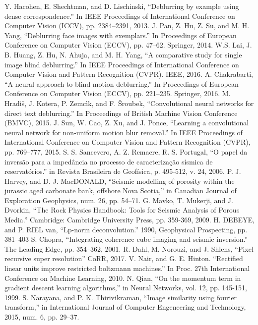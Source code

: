 \documentclass[conference]{IEEEtran}
\begin{document}
\begin{thebibliography}{00}
		Y. Hacohen, E. Shechtman, and D. Lischinski, ``Deblurring by example using dense correspondence.'' In IEEE Proceedings of International Conference on Computer Vision (ICCV), pp. 2384–2391, 2013.
		J. Pan, Z. Hu, Z. Su, and M. H. Yang, ``Deblurring face images with exemplars.'' In Proceedings of European Conference on Computer Vision (ECCV), pp. 47–62. Springer, 2014.
		W.S. Lai, J. B. Huang, Z. Hu, N. Ahuja, and M. H. Yang, ``A comparative study for single image blind deblurring.'' In IEEE Proceedings of International Conference on Computer Vision and Pattern Recognition (CVPR). IEEE, 2016.
	A. Chakrabarti, ``A neural approach to blind motion deblurring.'' In Proceedings of European Conference on Computer Vision (ECCV), pp. 221–235. Springer, 2016.
		M. Hradiš, J. Kotera, P. Zemcı́k, and F. Šroubek, ``Convolutional neural networks for direct text deblurring.'' In Proceedings of British Machine Vision Conference (BMVC), 2015.
		J. Sun, W. Cao, Z. Xu, and J. Ponce, ``Learning a convolutional neural network for non-uniform motion blur removal.'' In IEEE Proceedings of International Conference on Computer Vision and Pattern Recognition (CVPR), pp. 769–777, 2015.
		S. S. Sancevero, A. Z. Remacre, R. S. Portugal, ``O papel da inversão para a impedância no processo de caracterização sísmica de reservatórios.'' in Revista Brasileira de Geofísica, p. 495-512, v. 24, 2006.
 		P. J. Harvey, and D. J. MacDONALD, ``Seismic modelling of porosity within the jurassic aged carbonate bank, offshore Nova Scotia,'' in  Canadian Journal of Exploration Geophysics, num. 26, pp. 54–71.
		G. Mavko, T. Mukerji, and J. Dvorkin, ``The Rock Physics Handbook: Tools for Seismic Analysis of Porous Media.'' Cambridge: Cambridge University Press, pp. 359-369, 2009.
		H. DEBEYE, and P. RIEL van, ``Lp-norm deconvolution.'' 1990, Geophysical Prospecting, pp. 381–403
		S. Chopra, ``Integrating coherence cube imaging and seismic inversion.'' The Leading Edge, pp. 354–362, 2001.
		R. Dahl, M. Norouzi, and J. Shlens, ``Pixel recursive super resolution'' CoRR, 2017.
 		V. Nair, and G. E. Hinton. ``Rectified linear units improve restricted boltzmann machines.'' In Proc. 27th International Conference on Machine Learning, 2010.
		N. Qian, ``On the momentum term in gradient descent learning algorithms,'' in Neural Networks, vol. 12, pp. 145-151, 1999.
		S. Narayana, and P. K. Thirivikraman, ``Image similarity using fourier transform,'' in International Journal of Computer Engeneering and Technology, 2015, num. 6, pp. 29–37.

\end{thebibliography}
\end{document}
